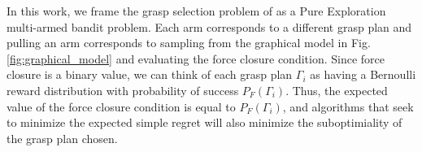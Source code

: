 \documentclass[journal,transmag]{IEEEtran}%
\begin{document}

%
%
%

In this work, we frame the grasp selection problem of  as a Pure Exploration multi-armed bandit problem.
Each arm corresponds to a different grasp plan and pulling an arm corresponds to sampling from the graphical model in Fig. \ref{fig:graphical_model} and evaluating the force closure condition.
Since force closure is a binary value, we can think of each grasp plan $\Gamma_i$ as having a Bernoulli reward distribution with probability of success $P_F(\Gamma_i)$.
Thus, the expected value of the force closure condition is equal to $P_F(\Gamma_i)$, and algorithms that seek to minimize the expected simple regret will also minimize the suboptimiality of the grasp plan chosen.
\end{document}
